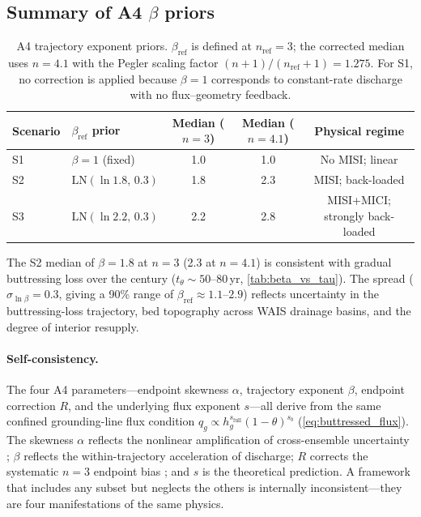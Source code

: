 \documentclass[11pt]{article}
\newcommand{\qg}{q_g}
\newcommand{\hg}{h_g}
\begin{document}
\subsection{Summary of A4 $\beta$ priors}
\label{sec:beta_priors}

\begin{table}[ht]
\centering
\caption{A4 trajectory exponent priors. $\beta_{\mathrm{ref}}$ is defined at $n_{\mathrm{ref}} = 3$; the corrected median uses $n = 4.1$ with the Pegler scaling factor $(n+1)/(n_{\mathrm{ref}}+1) = 1.275$. For S1, no correction is applied because $\beta = 1$ corresponds to constant-rate discharge with no flux--geometry feedback.}
\label{tab:beta_priors}
\smallskip
\begin{tabular}{l l c c c}
\toprule
Scenario & $\beta_{\mathrm{ref}}$ prior & Median ($n{=}3$) & Median ($n{=}4.1$) & Physical regime \\
\midrule
S1 & $\beta = 1$ (fixed) & 1.0 & 1.0 & No MISI; linear \\
S2 & $\mathrm{LN}(\ln 1.8,\, 0.3)$ & 1.8 & 2.3 & MISI; back-loaded \\
S3 & $\mathrm{LN}(\ln 2.2,\, 0.3)$ & 2.2 & 2.8 & MISI+MICI; strongly back-loaded \\
\bottomrule
\end{tabular}
\end{table}

The S2 median of $\beta = 1.8$ at $n = 3$ (2.3 at $n = 4.1$) is consistent with gradual buttressing loss over the century ($t_\theta \sim 50$--80\,yr, \cref{tab:beta_vs_tau}). The spread ($\sigma_{\ln\beta} = 0.3$, giving a 90\% range of $\beta_{\mathrm{ref}} \approx 1.1$--$2.9$) reflects uncertainty in the buttressing-loss trajectory, bed topography across WAIS drainage basins, and the degree of interior resupply.

\paragraph{Self-consistency.} The four A4 parameters---endpoint skewness $\alpha$, trajectory exponent $\beta$, endpoint correction $R$, and the underlying flux exponent $s$---all derive from the same confined grounding-line flux condition $\qg \propto \hg^{s_{\mathrm{full}}}(1-\theta)^{s_b}$ (\cref{eq:buttressed_flux}). The skewness $\alpha$ reflects the nonlinear amplification of cross-ensemble uncertainty \citep{Robel2019}; $\beta$ reflects the within-trajectory acceleration of discharge; $R$ corrects the systematic $n = 3$ endpoint bias \citep{Martin2026}; and $s$ is the theoretical prediction. A framework that includes any subset but neglects the others is internally inconsistent---they are four manifestations of the same physics.
\end{document}
